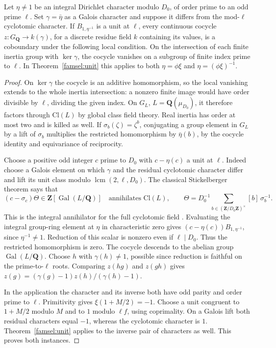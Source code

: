 \begin{proposition}\label{famsel:stick}
Let \(\eta\ne1\) be an integral Dirichlet character modulo \(D_0\),
of order prime to an odd prime \(\ell\). Set \(\gamma=\bar\eta\)
as a Galois character and suppose it differs from the mod-\(\ell\)
cyclotomic character. If \(B_{1,\eta^{-1}}\) is a unit at \(\ell\),
every continuous cocycle \(z:G_{\mathbf Q}\to k(\gamma)\), for a
discrete residue field \(k\) containing its values, is a coboundary
under the following local condition. On the intersection of each
finite inertia group with \(\ker\gamma\), the cocycle vanishes on a
subgroup of finite index prime to \(\ell\).
In Theorem~\ref{famsel:unit} this applies to both
\(\eta=\phi\xi\) and \(\eta=(\phi\xi)^{-1}\).
\end{proposition}
\begin{proof}
On \(\ker\gamma\) the cocycle is an additive homomorphism, so the
local vanishing extends to the whole inertia intersection: a nonzero
finite image would have order divisible by \(\ell\), dividing the
given index. On \(G_L\), \(L=\mathbf Q(\mu_{D_0})\), it therefore
factors through \(\mathrm{Cl}(L)\) by global class field theory.
Real inertia has order at most two and is killed as well. If
\(\sigma_b(\zeta)=\zeta^b\), conjugating a group element in \(G_L\)
by a lift of \(\sigma_b\) multiplies the restricted homomorphism by
\(\bar\eta(b)\), by the cocycle identity and equivariance of reciprocity.

Choose a positive odd integer \(c\) prime to \(D_0\) with
\(c-\eta(c)\) a unit at \(\ell\). Indeed choose a Galois element on
which \(\gamma\) and the residual cyclotomic character differ and
lift its unit class modulo \(\operatorname{lcm}(2,\ell,D_0)\).
The classical Stickelberger theorem says that
\[
 (c-\sigma_c)\Theta\in\mathbf Z[\operatorname{Gal}(L/\mathbf Q)]
 \quad\text{annihilates }\mathrm{Cl}(L),\qquad
 \Theta=D_0^{-1}\!\!\sum_{b\in(\mathbf Z/D_0\mathbf Z)^\times}
                  [b]\,\sigma_b^{-1}.
\]
This is the integral annihilator for the full cyclotomic field
\cite{stickelberger1890}. Evaluating the integral group-ring element
at \(\eta\) in characteristic zero gives
\((c-\eta(c))B_{1,\eta^{-1}}\), since \(\eta^{-1}\ne1\).
Reduction of this scalar is nonzero even if \(\ell\mid D_0\).
Thus the restricted homomorphism is zero. The cocycle descends to
the abelian group \(\operatorname{Gal}(L/\mathbf Q)\). Choose \(h\)
with \(\gamma(h)\ne1\), possible since reduction is faithful on the
prime-to-\(\ell\) roots. Comparing \(z(hg)\) and \(z(gh)\) gives
\(z(g)=(\gamma(g)-1)z(h)/(\gamma(h)-1)\).

In the application the character and its inverse both have odd parity
and order prime to \(\ell\). Primitivity gives \(\xi(1+M/2)=-1\).
Choose a unit congruent to \(1+M/2\) modulo \(M\) and to \(1\) modulo
\(\ell f\), using coprimality. On a Galois lift both residual characters
equal \(-1\), whereas the cyclotomic character is \(1\).
Theorem~\ref{famsel:unit} applies to the inverse pair of characters
as well. This proves both instances.
\end{proof}
